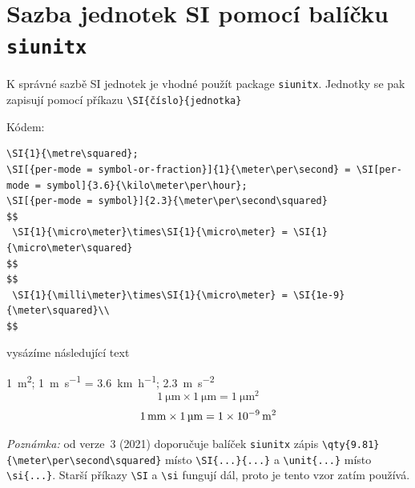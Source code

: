 
\section{Sazba jednotek SI pomocí balíčku \texttt{siunitx}}

K správné sazbě SI jednotek je vhodné použít package \texttt{siunitx}.
Jednotky se pak zapisují pomocí příkazu \verb|\SI{číslo}{jednotka}|  

Kódem: 
{\footnotesize
\begin{verbatim}
\SI{1}{\metre\squared}; 
\SI[{per-mode = symbol-or-fraction}]{1}{\meter\per\second} = \SI[per-mode = symbol]{3.6}{\kilo\meter\per\hour};
\SI[{per-mode = symbol}]{2.3}{\meter\per\second\squared} 
$$
 \SI{1}{\micro\meter}\times\SI{1}{\micro\meter} = \SI{1}{\micro\meter\squared}
$$ 
$$
 \SI{1}{\milli\meter}\times\SI{1}{\micro\meter} = \SI{1e-9}{\meter\squared}\\
$$
\end{verbatim}}
vysázíme následující text

\SI{1}{\metre\squared}; 
  \SI[{per-mode = symbol-or-fraction}]{1}{\meter\per\second} = \SI[per-mode = symbol]{3.6}{\kilo\meter\per\hour};
  \SI[{per-mode = symbol}]{2.3}{\meter\per\second\squared} 
$$
   \SI{1}{\micro\meter}\times\SI{1}{\micro\meter} = \SI{1}{\micro\meter\squared}
$$ 
$$
   \SI{1}{\milli\meter}\times\SI{1}{\micro\meter} = \SI{1e-9}{\meter\squared}\\
$$

\medskip
\noindent\textit{Poznámka:} od verze~3 (2021) doporučuje balíček \texttt{siunitx} zápis
\verb|\qty{9.81}{\meter\per\second\squared}| místo \verb|\SI{...}{...}| a \verb|\unit{...}| místo \verb|\si{...}|.
Starší příkazy \verb|\SI| a \verb|\si| fungují dál, proto je tento vzor zatím používá.
